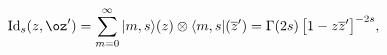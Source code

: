 \begin{equation}
\mathrm{Id}_s(z,\oz')=\sum_{m=0}^{\infty}|m,s\rangle(z)\otimes\langle m,s|(\overline{z}')
=\Gamma(2s)\,\bigl[1-z\overline{z}'\bigr]^{-2s},
\label{id}
\end{equation}

